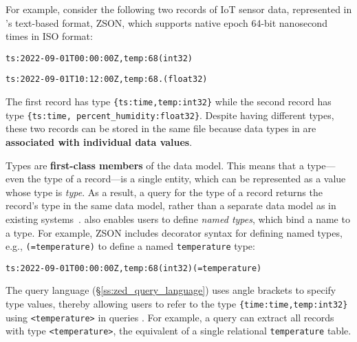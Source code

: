 For example, consider the following two records of IoT sensor data, represented in \sys{}'s text-based format, ZSON, which supports native epoch 64-bit nanosecond times in ISO format:

\noindent{}\texttt{{ts:2022-09-01T00:00:00Z,temp:68(int32)}}

\noindent{}\texttt{{ts:2022-09-01T10:12:00Z,temp:68.(float32)}}

\noindent{}The first record has type \texttt{\{ts:time,temp:int32\}} while the second record has type \texttt{\{ts:time, percent\_humidity:float32\}}.
Despite having different types, these two records can be stored in the same file because data types in \sys{} are {\bf associated with individual data values}.


Types are {\bf first-class members} of the \sys{} data model. This means that a type---even the type of a record---is a single entity, which can be represented as a \sys{} value whose type is {\em type}. As a result, a query for the type of a record returns the record's type in the same \sys{} data model, rather than a separate data model as in existing systems~\cite{aurum}. \sys{} also enables users to define {\em named types}, which bind a name to a type. For example, ZSON includes decorator syntax for defining named types, e.g., \texttt{(=temperature)} to define a named \texttt{temperature} type:

\noindent{}\texttt{{ts:2022-09-01T00:00:00Z,temp:68(int32)}(=temperature)}

\noindent{}The \sys{} query language (\S\ref{ss:zed_query_language}) uses angle brackets to specify type values, thereby allowing users to refer to the type \texttt{\{time:time,temp:int32\}} using \texttt{<temperature>} in queries . For example, a query can extract all records with type \texttt{<temperature>}, the equivalent of a single relational \texttt{temperature} table.


